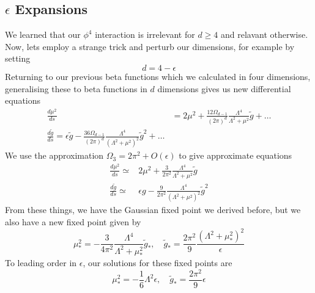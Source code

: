 \subsection{$ \epsilon $ Expansions} 
We learned that our $ \phi ^ 4 $ interaction 
is irrelevant for $ d \geq 4 $ and relavant otherwise. 
Now, lets employ a strange trick and perturb our
dimensions, for example by setting 
\[
 d  = 4 - \epsilon  
\] Returning to our previous beta functions 
which we calculated in four dimensions, generalising 
these to beta functions in $ d $ dimensions gives us 
new differential equations 
\begin{align*}
	\frac{ d \mu ^ 2 }{ ds } &=  2 \mu ^ 2 + 
	\frac{ 12 \Omega_{ d- 1 } }{ ( 2 \pi ) ^ d } \frac{ \Lambda ^ 4  }{ 
	\Lambda ^ 2 + \mu ^ 2  }  \tilde{ g } + \dots  \\
	\frac{ d \tilde{ g }  }{ds } = 
	\epsilon \tilde{ g } - \frac{ 36 \Omega_{ d- 1 } }{ ( 2 \pi ) ^ d }
	\frac{ \Lambda ^ 4 }{ ( \Lambda ^ 2 + \mu ^ 2 ) ^ 2 } \tilde{ g } ^ 2 + \dots 
\end{align*}
We use the approximation $ \Omega_ 3  = 2 \pi ^ 2 + O ( \epsilon ) $ 
to give approximate equations 
 \begin{align*}
	 \frac{ d \mu ^ 2 }{ds } \simeq & 2 \mu ^ 2 + \frac{3}{2 \pi ^ 2 } \frac{
	 \Lambda ^ 4 }{ \Lambda ^ 2 + \mu ^ 2 } \tilde{ g } \\
	 \frac{ d \tilde{g }  }{ds  } \simeq & 
	 \epsilon g  - \frac{ 9 }{ 2 \pi ^ 2 } \frac{ \Lambda ^ 4 }{
	 ( \Lambda ^ 2 + \mu ^ 2 ) ^ 2 } \tilde{g } ^ 2  
\end{align*}
From these things, we have the Gaussian 
fixed point we derived before, but 
we also have a new fixed point given by 
\[
 \mu _{ * } ^ 2 = - \frac{3 }{ 4 \pi ^ 2 } \frac{ \Lambda ^ 4 }{ 
 \Lambda ^ 2 + \mu _ * ^ 2 } \tilde{ g } _ * , \quad 
 \tilde{ g } _ * = \frac{ 2 \pi ^ 2 }{ 9 } \frac{ ( \Lambda ^ 2 + \mu _ * ^ 2 ) ^ 2 }{
 \epsilon } 
\] To leading order in $\epsilon $, our solutions for these 
fixed points are 
\[
 \mu _ * ^ 2 =  - \frac{1}{6 } \Lambda  ^2 \epsilon , \quad 
 \tilde{ g } _ *  = \frac{ 2 \pi ^ 2  }{ 9 }  \epsilon 
\] 
